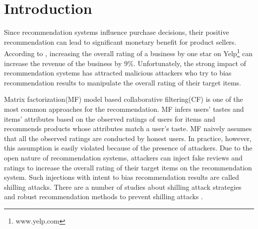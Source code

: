 \documentclass[master,english,final]{kaist-ucs}
\begin{document}
    \tableofcontents

    \listoftables

    \listoffigures



\chapter{Introduction}

Since recommendation systems influence purchase decisions, their positive recommendation can lead to significant monetary benefit for product sellers.
According to \cite{yelp_study}, increasing the overall rating of a business by one star on Yelp\footnote{www.yelp.com} can increase the revenue of the business by 9\%.
Unfortunately, the strong impact of recommendation systems has attracted malicious attackers who try to bias recommendation results to manipulate the overall rating of their target items.

Matrix factorization(MF) model based collaborative filtering(CF) \cite{MF_CF} is one of the most common approaches for the recommendation.
MF infers users’ tastes and items’ attributes based on the observed ratings of users for items and recommends products whose attributes match a user’s taste.
MF naively assumes that all the observed ratings are conducted by honest users.
In practice, however, this assumption is easily violated because of the presence of attackers.
Due to the open nature of recommendation systems, attackers can inject fake reviews and ratings to increase the overall rating of their target items on the recommendation system.
Such injections with intent to bias recommendation results are called shilling attacks.
There are a number of studies about shilling attack strategies \cite{shilling_attack_1,shilling_attack_2,shilling_attack_3,shilling_attack_guide} and robust recommendation methods to prevent shilling attacks \cite{RMF, AttackResistant,LiesAndPropaganda,UnsupervisedShilling,text_duplicate, text_crowd}.
\end{document}
